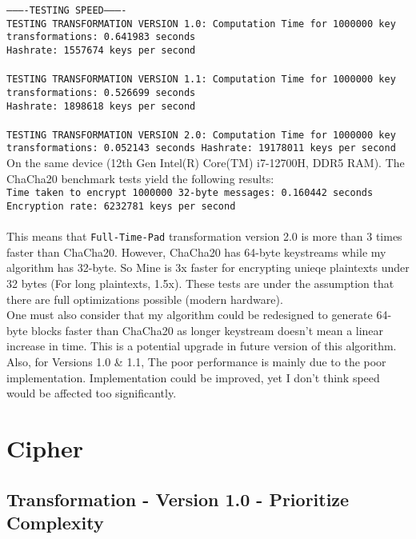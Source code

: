\documentclass[fleqn, a4paper,12pt]{article}
\begin{document}
\texttt{----------TESTING SPEED----------\\
TESTING TRANSFORMATION VERSION 1.0: Computation Time for 1000000 key transformations: 0.641983 seconds\\
Hashrate: 1557674 keys per second\\
\\
TESTING TRANSFORMATION VERSION 1.1: Computation Time for 1000000 key transformations: 0.526699 seconds\\
Hashrate: 1898618 keys per second\\
\\
TESTING TRANSFORMATION VERSION 2.0: Computation Time for 1000000 key transformations: 0.052143 seconds
Hashrate: 19178011 keys per second
}
\\
On the same device (12th Gen Intel(R) Core(TM) i7-12700H, DDR5 RAM). The ChaCha20 benchmark tests yield the following results:\\
\texttt{Time taken to encrypt 1000000 32-byte messages: 0.160442 seconds\\
Encryption rate: 6232781 keys per second}\\
\\
This means that \texttt{Full-Time-Pad} transformation version 2.0 is more than 3 times faster than ChaCha20. However, ChaCha20 has 64-byte keystreams while my algorithm has 32-byte. So Mine is 3x faster for encrypting unieqe plaintexts under 32 bytes (For long plaintexts, 1.5x). These tests are under the assumption that there are full optimizations possible (modern hardware).
\\
One must also consider that my algorithm could be redesigned to generate 64-byte blocks faster than ChaCha20 as longer keystream doesn't mean a linear increase in time. This is a potential upgrade in future version of this algorithm.
\\
Also, for Versions 1.0 \& 1.1, The poor performance is mainly due to the poor implementation. Implementation could be improved, yet I don't think speed would be affected too significantly.

\section {Cipher}

\subsection{Transformation - Version 1.0 - Prioritize Complexity}
\end{document}
